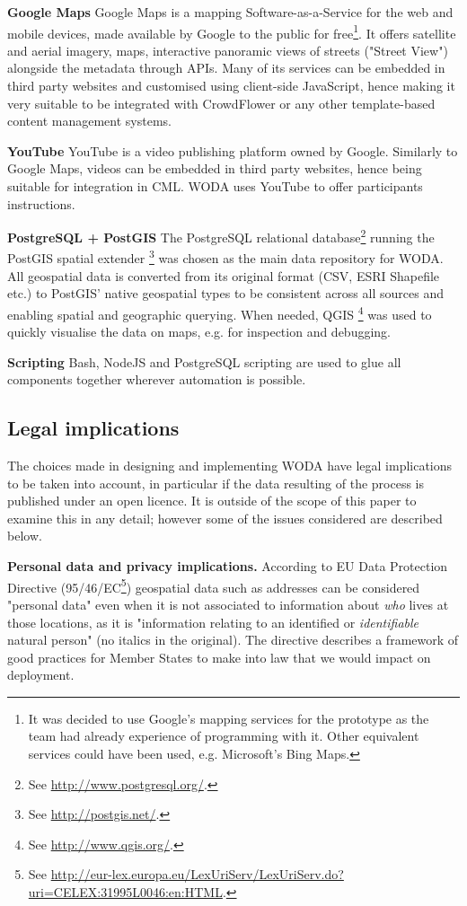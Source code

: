 \textbf{Google Maps} Google Maps is a mapping Software-as-a-Service for the web and mobile devices, made available by Google to the public for free\footnote{It was decided to use Google's mapping services for the prototype as the team had already experience of programming with it. Other equivalent services could have been used, e.g. Microsoft's Bing Maps.}. It offers satellite and aerial imagery, maps, interactive panoramic views of streets ("Street View") alongside the metadata through APIs. Many of its services can be embedded in third party websites and customised using client-side JavaScript, hence making it very suitable to be integrated with CrowdFlower or any other template-based content management systems. 

\textbf{YouTube} YouTube is a video publishing platform owned by Google. Similarly to Google Maps, videos can be embedded in third party websites, hence being suitable for integration in CML. WODA uses YouTube to offer participants instructions.  

\textbf{PostgreSQL + PostGIS} The PostgreSQL relational database\footnote{See \url{http://www.postgresql.org/}.} running the PostGIS spatial extender \footnote{See \url{http://postgis.net/}.} was chosen as the main data repository for WODA. All geospatial data is converted from its original format (CSV, ESRI Shapefile etc.) to PostGIS' native geospatial types to be consistent across all sources and enabling spatial and geographic querying. When needed, QGIS \footnote{See \url{http://www.qgis.org/}.} was used to quickly visualise the data on maps, e.g. for inspection and debugging.

\textbf{Scripting} Bash, NodeJS and PostgreSQL scripting are used to glue all components together wherever automation is possible.  

\subsection{Legal implications}

The choices made in designing and implementing WODA have legal implications to be taken into account, in particular if the data resulting of the process is published under an open licence. It is outside of the scope of this paper to examine this in any detail; however some of the issues considered are described below.

\textbf{Personal data and privacy implications.} According to EU Data Protection Directive (95/46/EC\footnote{See \url{http://eur-lex.europa.eu/LexUriServ/LexUriServ.do?uri=CELEX:31995L0046:en:HTML}.}) geospatial data such as addresses can be considered "personal data" even when it is not associated to information about {\it who} lives at those locations, as it is "information relating to an identified or {\it identifiable} natural person" (no italics in the original). The directive describes a framework of good practices for Member States to make into law that we would impact on deployment.
	
